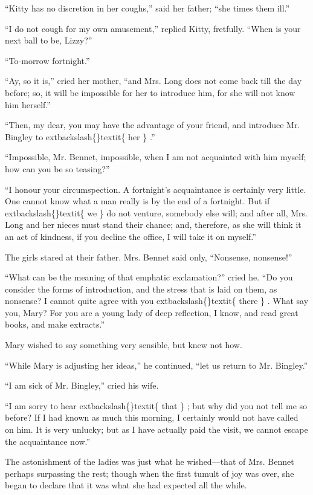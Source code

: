 \documentclass[10pt]{book}
\begin{document}
   “Kitty has no discretion in her coughs,” said her father; “she times
them ill.”
  

   “I do not cough for my own amusement,” replied Kitty, fretfully. “When
is your next ball to be, Lizzy?”
  

   “To-morrow fortnight.”
  

   “Ay, so it is,” cried her mother, “and Mrs. Long does not come back till
the day before; so, it will be impossible for her to introduce him, for
she will not know him herself.”
  

   “Then, my dear, you may have the advantage of your friend, and introduce
Mr. Bingley to
   	extbackslash\{\}textit\{
    her
   \}
   .”
  

   “Impossible, Mr. Bennet, impossible, when I am not acquainted with him
myself; how can you be so teasing?”
  

   “I honour your circumspection. A fortnight’s acquaintance is certainly
very little. One cannot know what a man really is by the end of a
fortnight. But if
   	extbackslash\{\}textit\{
    we
   \}
   do not venture, somebody else will; and after
all, Mrs. Long and her nieces must stand their chance; and, therefore,
   as she will think it an act of kindness, if you decline the office, I
will take it on myself.”
  

   The girls stared at their father. Mrs. Bennet said only, “Nonsense,
nonsense!”
  

   “What can be the meaning of that emphatic exclamation?” cried he. “Do
you consider the forms of introduction, and the stress that is laid on
them, as nonsense? I cannot quite agree with you
   	extbackslash\{\}textit\{
    there
   \}
   . What say you,
Mary? For you are a young lady of deep reflection, I know, and read
great books, and make extracts.”
  

   Mary wished to say something very sensible, but knew not how.
  

   “While Mary is adjusting her ideas,” he continued, “let us return to Mr.
Bingley.”
  

   “I am sick of Mr. Bingley,” cried his wife.
  

   “I am sorry to hear
   	extbackslash\{\}textit\{
    that
   \}
   ; but why did you not tell me so before? If I
had known as much this morning, I certainly would not have called on
him. It is very unlucky; but as I have actually paid the visit, we
cannot escape the acquaintance now.”
  

   The astonishment of the ladies was just what he wished—that of Mrs.
Bennet perhaps surpassing the rest; though when the first tumult of joy
was over, she began to declare that it was what she had expected all the
while.
  
\end{document}
